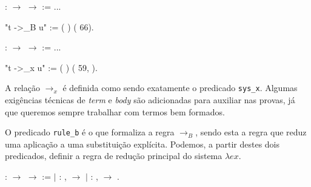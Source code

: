 \bigskip
\coqdocnoindent {}  : 
\ensuremath{\rightarrow}  \ensuremath{\rightarrow}
 := ...\coqdoceol

\coqdocnoindent
{} "t ->\_B u" :=
( 
) (  66).\coqdoceol

\coqdocnoindent
{} 
:  \ensuremath{\rightarrow} 
\ensuremath{\rightarrow}  := ...\coqdoceol

\coqdocnoindent
{} "t ->\_x u" :=
(  )
(  59, 
).\coqdoceol
\bigskip

A relação $\rightarrow_x$ é definida como sendo exatamente o predicado
\texttt{sys\_x}. Algumas exigências técnicas de \emph{term} e \emph{body} são
adicionadas para auxiliar nas provas, já que queremos sempre trabalhar com
termos bem formados.

O predicado \texttt{rule\_b} é o que formaliza a regra $\rightarrow_B$, sendo
esta a regra que reduz uma aplicação a uma substituição explícita. Podemos, a
partir destes dois predicados, definir a regra de redução principal do sistema
$\lambda ex$.

\bigskip
\coqdocnoindent {} : 
\ensuremath{\rightarrow}  \ensuremath{\rightarrow}
 := \coqdoceol
\coqdocnoindent \ensuremath{|}  : \coqdockw{\ensuremath{\forall}} 
,    \ensuremath{\rightarrow}
 
\coqdoceol \coqdocnoindent \ensuremath{|} 
: \coqdockw{\ensuremath{\forall}}  ,
   \ensuremath{\rightarrow}
 
.\coqdoceol

